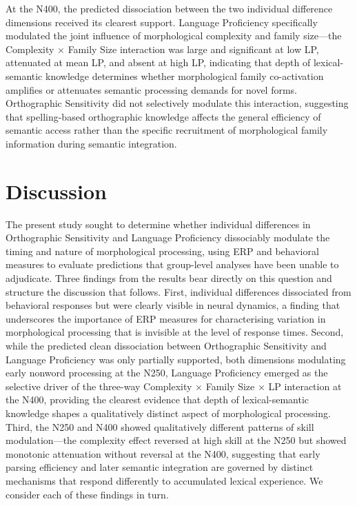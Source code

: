 \documentclass[utf8]{FrontiersinHarvard} %
\begin{document}
At the N400, the predicted dissociation between the two individual difference dimensions received its clearest support. Language Proficiency specifically modulated the joint influence of morphological complexity and family size—the Complexity $\times$ Family Size interaction was large and significant at low LP, attenuated at mean LP, and absent at high LP, indicating that depth of lexical-semantic knowledge determines whether morphological family co-activation amplifies or attenuates semantic processing demands for novel forms. Orthographic Sensitivity did not selectively modulate this interaction, suggesting that spelling-based orthographic knowledge affects the general efficiency of semantic access rather than the specific recruitment of morphological family information during semantic integration.





\section{Discussion}

The present study sought to determine whether individual differences in Orthographic Sensitivity and Language Proficiency dissociably modulate the timing and nature of morphological processing, using ERP and behavioral measures to evaluate predictions that group-level analyses have been unable to adjudicate. Three findings from the results bear directly on this question and structure the discussion that follows. First, individual differences dissociated from behavioral responses but were clearly visible in neural dynamics, a finding that underscores the importance of ERP measures for characterising variation in morphological processing that is invisible at the level of response times. Second, while the predicted clean dissociation between Orthographic Sensitivity and Language Proficiency was only partially supported, both dimensions modulating early nonword processing at the N250, Language Proficiency emerged as the selective driver of the three-way Complexity $\times$ Family Size $\times$ LP interaction at the N400, providing the clearest evidence that depth of lexical-semantic knowledge shapes a qualitatively distinct aspect of morphological processing. Third, the N250 and N400 showed qualitatively different patterns of skill modulation—the complexity effect reversed at high skill at the N250 but showed monotonic attenuation without reversal at the N400, suggesting that early parsing efficiency and later semantic integration are governed by distinct mechanisms that respond differently to accumulated lexical experience. We consider each of these findings in turn.
\end{document}
